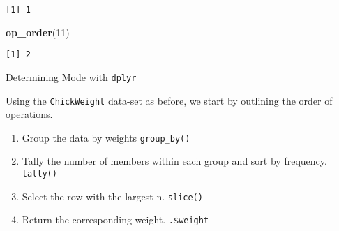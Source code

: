 \documentclass[12pt,]{article}
\newenvironment{Shaded}{\begin{snugshade}}{\end{snugshade}}
\newcommand{\DataTypeTok}[1]{\textcolor[rgb]{0.13,0.29,0.53}{#1}}
\newcommand{\DecValTok}[1]{\textcolor[rgb]{0.00,0.00,0.81}{#1}}
\newcommand{\KeywordTok}[1]{\textcolor[rgb]{0.13,0.29,0.53}{\textbf{#1}}}
\newcommand{\NormalTok}[1]{#1}
\newcommand{\OperatorTok}[1]{\textcolor[rgb]{0.81,0.36,0.00}{\textbf{#1}}}
\newcommand{\OtherTok}[1]{\textcolor[rgb]{0.56,0.35,0.01}{#1}}
\newcommand{\StringTok}[1]{\textcolor[rgb]{0.31,0.60,0.02}{#1}}
\providecommand{\tightlist}{%
  \setlength{\itemsep}{0pt}\setlength{\parskip}{0pt}}
\begin{document}
\begin{Shaded}
\end{Shaded}

\begin{verbatim}
[1] 1
\end{verbatim}

\begin{Shaded}
\begin{Highlighting}[]
\KeywordTok{op_order}\NormalTok{(}\DecValTok{11}\NormalTok{)}
\end{Highlighting}
\end{Shaded}

\begin{verbatim}
[1] 2
\end{verbatim}

Determining Mode with \texttt{dplyr}

Using the \texttt{ChickWeight} data-set as before, we start by outlining
the order of operations.

\begin{enumerate}
\def\labelenumi{\arabic{enumi}.}
\tightlist
\item
  Group the data by weights \texttt{group\_by()}
\item
  Tally the number of members within each group and sort by frequency.
  \texttt{tally()}
\item
  Select the row with the largest n. \texttt{slice()}
\item
  Return the corresponding weight. \texttt{.\$weight}
\end{enumerate}

\begin{Shaded}
\end{Shaded}
\end{document}
